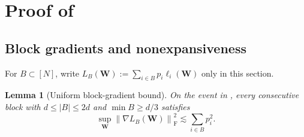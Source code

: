 \documentclass[11pt]{article}
\newtheorem{lemma}[lemma]{Lemma}
\theoremstyle{definition}
\newcommand{\Wb}{\mathbf{W}}
\newcommand{\normF}[1]{\left\lVert #1\right\rVert_{\mathrm F}}
\begin{document}



\section{Proof of }

\subsection{Block gradients and nonexpansiveness}

For $B\subset[N]$, write
$L_B(\Wb):=\sum_{i\in B}p_i\ell_i(\Wb)$ only in this section.

\begin{lemma}[Uniform block-gradient bound]
\label{lem:block-v2}
On the event in , every consecutive block with
$d\leq|B|\leq2d$ and $\min B\geq d/3$ satisfies
\[
 \sup_{\Wb}\normF{\nabla L_B(\Wb)}^2
 \lesssim\sum_{i\in B}p_i^2.
\]
\end{lemma}
\end{document}
